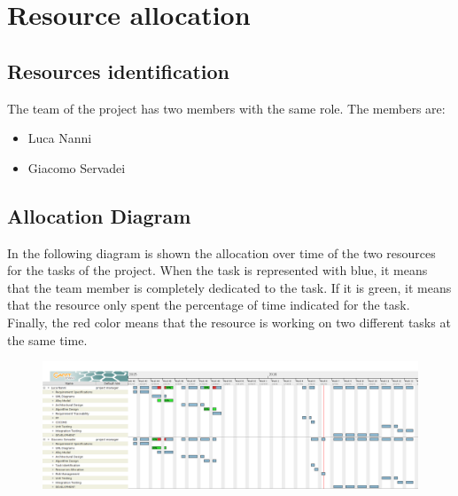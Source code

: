 \chapter{Resource allocation}

\section{Resources identification}
The team of the project has two members with the same role. The members are:

\begin{itemize}
	\item Luca Nanni
	\item Giacomo Servadei
\end{itemize}

\section{Allocation Diagram}
In the following diagram is shown the allocation over time of the two resources for the tasks of the project. When the task is represented with blue, it means that the team member is completely dedicated to the task. If it is green, it means that the resource only spent the percentage of time indicated for the task. Finally, the red color means that the resource is working on two different tasks at the same time.

\begin{figure}[H]
	\centering
	\includegraphics[angle=90,scale=0.35]{Resource/resources}
\end{figure}